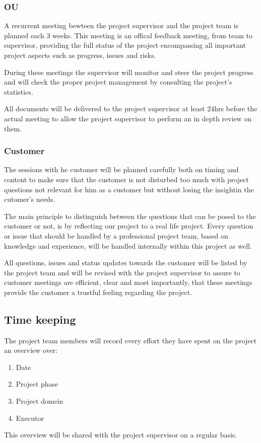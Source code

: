 \subsubsection{OU}
A recurrent meeting bewteen the project supervisor and the project team is planned each 3 weeks.
This meeting is an offical feedback meeting, from team to supervisor, providing the full status of the project encompassing all important project aspects such as progress, issues and risks. 


During these meetings the supervisor will monitor and steer the project progress and will check the proper project management by consulting the project's statistics.

All documents will be delivered to the project supervisor at least 24hrs before the actual meeting to allow the project supervisor to perform an in depth review on them.

\subsubsection{Customer}

The sessions with he customer will be planned carefully both on timing and content to make sure that the customer is not disturbed too much with project questions not relevant for him as a customer but without losing the insightin the cutomer's needs.

The main principle to distinguish between the questions that can be posed to the customer or not, is by reflecting our project to a real life project. 
Every question or issue that should be handled by a professional project team, based on knowledge and experience, will be handled internally within this project as well.

All questions, issues and status updates towards the customer will be listed by the project team and will be revised with the project supervisor to assure to customer meetings are efficient, clear and most importantly, that these meetings provide the customer a trustful feeling regarding the project.

\subsection{Time keeping}
The project team members will record every effort they have spent on the project an overview over:
\begin{enumerate}
	\item Date
	\item Project phase
	\item Project domein
	\item Executor
\end {enumerate}
This overview will be shared with the project supervisor on a regular basis.

